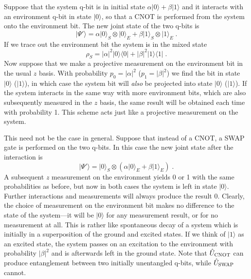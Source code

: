 \documentclass[12pt]{article}
\def\bra#1{{\langle #1 |}}
\def\ket#1{{| #1 \rangle}}
\def\U{{\hat U}}
\begin{document}
Suppose that the system q-bit is in initial
state $\alpha\ket0+\beta\ket1$ and it
interacts with an environment q-bit in state $\ket0$, so that
a CNOT is performed from the system onto
the environment bit.  The new joint state of the two q-bits is
\begin{equation}
\ket{\Psi'} = \alpha\ket0_S\otimes\ket0_E
  + \beta\ket1_S\otimes\ket1_E \;.
\end{equation}
If we trace out the environment bit the system is in the mixed state
\begin{equation}
\rho_S = |\alpha|^2 \ket0\bra0 + |\beta|^2 \ket1\bra1 \;.
\end{equation}
Now suppose that we make a projective measurement on the environment bit
in the usual $z$ basis.  With probability $p_0 = |\alpha|^2$
($p_1 = |\beta|^2$) we find the bit in state $\ket0$ ($\ket1$), in which
case the system bit will {\it also} be projected into state
$\ket0$ ($\ket1$).  If the system interacts in the same way with more
environment bits, which are also subsequently measured in the $z$ basis,
the same result will be obtained each time with probability 1.  This
scheme acts just like a projective measurement on the system.

This need not be the case in general.  Suppose that instead of a CNOT,
a SWAP gate is performed on the two q-bits.  In this case the new joint
state after the interaction is
\begin{equation}
\ket{\Psi'} = \ket0_S \otimes
  \left( \alpha\ket0_E + \beta\ket1_E \right) \;.
\end{equation}
A subsequent $z$ measurement on the environment yields 0 or 1 with the
same probabilities as before, but now in both cases the system is left
in state $\ket0$.  Further interactions and measurements will always
produce the result 0.  Clearly, the choice of measurement on the environment
bit makes no difference to the state of the system---it will be $\ket0$
for any measurement result, or for no measurement at all.  This is rather
like spontaneous decay of a system which is initially in a superposition
of the ground and excited states.  If we think of $\ket1$ as an excited
state, the system passes on an excitation to the environment with probability
$|\beta|^2$ and is afterwards left in the ground state.
Note that $\U_{\rm CNOT}$ can produce entanglement between two
initially unentangled q-bits, while $\U_{\rm SWAP}$ cannot.
\end{document}
